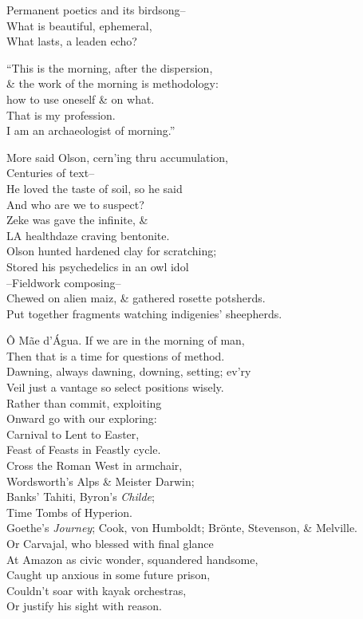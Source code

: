 Permanent poetics and its birdsong-- \\
What is beautiful, ephemeral, \\
What lasts, a leaden echo?

``This is the morning, after the dispersion, \\
\& the work of the morning is methodology: \\
how to use oneself \& on what. \\
That is my profession. \\
I am an archaeologist of morning.''

More said Olson, cern'ing thru accumulation, \\
Centuries of text-- \\
He loved the taste of soil, so he said \\
And who are we to suspect? \\
Zeke was gave the infinite, \& \\ 
LA healthdaze craving bentonite. \\
Olson hunted hardened clay for scratching; \\
Stored his psychedelics in an owl idol \\
--Fieldwork composing-- \\
Chewed on alien maiz, \& gathered rosette potsherds. \\
Put together fragments watching indigenies' sheepherds.

Ô Mãe d'Água.
If we are in the morning of man, \\
Then that is a time for questions of method. \\
Dawning, always dawning, downing, setting; ev'ry \\
Veil just a vantage so select positions wisely. \\
Rather than commit, exploiting \\
Onward go with our exploring: \\
Carnival to Lent to Easter, \\
Feast of Feasts in Feastly cycle. \\
Cross the Roman West in armchair, \\
Wordsworth's Alps \& Meister Darwin; \\
Banks' Tahiti, Byron's \textit{Childe}; \\
Time Tombs of Hyperion. \\
Goethe's \textit{Journey}; Cook, von Humboldt;
Brönte, Stevenson, \& Melville. \\
Or Carvajal, who blessed with final glance \\
At Amazon as civic wonder, squandered handsome, \\ 
Caught up anxious in some future prison, \\
Couldn't soar with kayak orchestras, \\
Or justify his sight with reason.

